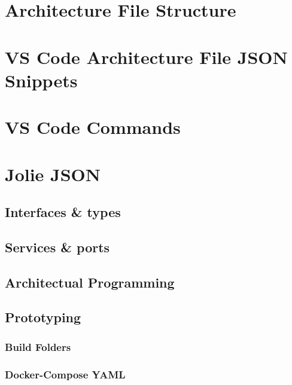 \appendixpage\noappendicestocpagenum\addappheadtotoc\chapter{Architecture File Structure}\label{appen:architecture-file-structure}


\chapter{VS Code Architecture File JSON Snippets}\label{appen:vscode_snippets}


\chapter{VS Code Commands}\label{appen:vscode_commands}


\chapter{Jolie JSON}
\section{Interfaces \& types}\label{appen:joliejson_iface_types}


\section{Services \& ports}\label{appen:joliejson_services}


\section{Architectual Programming}\label{appen:joliejson_architecture}


\section{Prototyping}
\subsection{Build Folders}\label{appen:joliejson_prototype}

\subsection{Docker-Compose YAML}\label{appen:docker_yaml}
